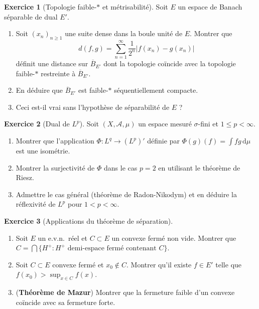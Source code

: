 \documentclass[a4paper,12pt]{book}
\newcommand{\dd}{\mathrm{d}}
\newcommand{\abs}[1]{\left| #1 \right|}
\theoremstyle{definition}
\newtheorem{exercice}{Exercice}[chapter]
\theoremstyle{plain}
\theoremstyle{remark}
\begin{document}
\begin{exercice}[Topologie faible-$*$ et métrisabilité]\label{exo:faible-etoile-metrisable}
Soit $E$ un espace de Banach séparable de dual $E'$.
\begin{enumerate}[label=(\alph*)]
    \item Soit $(x_n)_{n \geq 1}$ une suite dense dans la boule unité de $E$. Montrer que
          \[
              d(f,g) = \sum_{n=1}^{\infty} \frac{1}{2^n} \abs{f(x_n) - g(x_n)}
          \]
          définit une distance sur $\overline{B}_{E'}$ dont la topologie coïncide avec
          la topologie faible-$*$ restreinte à $\overline{B}_{E'}$.
    \item En déduire que $\overline{B}_{E'}$ est faible-$*$ séquentiellement compacte.
    \item Ceci est-il vrai sans l'hypothèse de séparabilité de $E$ ?
\end{enumerate}
\end{exercice}

\begin{exercice}[Dual de $L^p$]\label{exo:dual-Lp}
Soit $(X, \mathcal{A}, \mu)$ un espace mesuré $\sigma$-fini et $1 \leq p < \infty$.
\begin{enumerate}[label=(\alph*)]
    \item Montrer que l'application $\Phi : L^q \to (L^p)'$ définie par
          $\Phi(g)(f) = \int fg\, \dd\mu$ est une isométrie.
    \item Montrer la surjectivité de $\Phi$ dans le cas $p = 2$ en utilisant le
          théorème de Riesz.
    \item Admettre le cas général (théorème de Radon-Nikodym)
          et en déduire la réflexivité de $L^p$ pour $1 < p < \infty$.
\end{enumerate}
\end{exercice}

\begin{exercice}[Applications du théorème de séparation]\label{exo:applications-separation}
\begin{enumerate}[label=(\alph*)]
    \item Soit $E$ un e.v.n.\ réel et $C \subset E$ un convexe fermé non vide.
          Montrer que $C = \bigcap\{H^+ : H^+ \text{ demi-espace fermé contenant } C\}$.
    \item Soit $C \subset E$ convexe fermé et $x_0 \notin C$. Montrer qu'il existe
          $f \in E'$ telle que $f(x_0) > \sup_{x \in C} f(x)$.
    \item (\textbf{Théorème de Mazur}) Montrer que la fermeture
          faible d'un convexe coïncide avec sa fermeture forte.
\end{enumerate}
\end{exercice}
\end{document}
